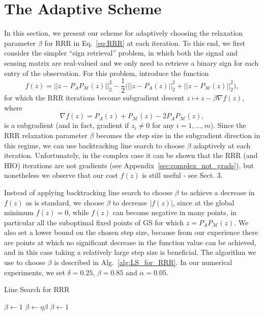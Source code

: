 \documentclass[12pt]{article}
\theoremstyle{definition}
\theoremstyle{remark}
\theoremstyle{definition}
\theoremstyle{problem}
\theoremstyle{definition}
\newcommand{\MM}{\mathcal{M}}
\begin{document}
\section{The Adaptive Scheme}
In this section, we present our scheme for adaptively choosing the relaxation parameter $\beta$ for RRR in Eq.~\ref{eq:RRR} at each iteration. To this end, we first consider the simpler ``sign retrieval'' problem, in which both the signal and sensing matrix are real-valued and we only need to retrieve a binary sign for each entry of the observation. For this problem, introduce the function 
\begin{equation}\label{eq:RRR_func}
    f(z) = ||z - P_AP_{\MM}(z)||_2^2 - \frac{1}{2}\Big(||z-P_A(z)||_2^2 + ||z-P_{\MM}(z)||_2^2\Big),
\end{equation}
for which the RRR iterations become subgradient descent $z\mapsto z-\beta\nabla f(z)$, where
\begin{equation}\label{eq:RRR_func_grad}
    \nabla f(z) = P_A(z) + P_{\MM}(z) - 2P_AP_{\MM}(z),
\end{equation}
is a subgradient (and in fact, gradient if $z_i\neq 0$ for any $i=1,\ldots, m$). Since the RRR relaxation parameter $\beta$ becomes the step size in the subgradient direction in this regime, we can use backtracking line search to choose $\beta$ adaptively at each iteration. Unfortunately, in the complex case it can be shown that the RRR (and HIO) iterations are not gradients (see Appendix~\ref{sec:complex_not_grads}), but nonetheless we observe that our cost $f(z)$ is still useful - see Sect. 3.

Instead of applying backtracking line search to choose $\beta$ to achieve a decrease in $f(z)$ as is standard, we choose $\beta$ to decrease $|f(z)|$, since at the global minimum $f(z)=0$, while $f(z)$ can become negative in many points, in particular all the suboptimal fixed points of GS for which $z = P_AP_{\MM}(z)$. We also set a lower bound on the chosen step size, because from our experience there are points at which no significant decrease in the function value can be achieved, and in this case taking a relatively large step size is beneficial. The algorithm we use to choose $\beta$ is described in Alg.~\ref{alg:LS_for_RRR}. In our numerical experiments, we set $\delta = 0.25$, $\beta = 0.85$ and $\alpha=0.05$.

\begin{algorithm}
\caption{Line Search for RRR}\label{alg:LS_for_RRR}
\begin{algorithmic}
\INPUT{$\alpha,\eta,\delta$}
\OUTPUT{$\beta$}
\State $\beta\gets 1$ 
    \State $\beta\gets \eta\beta$
\EndWhile
\If{$\beta \leq \delta$} 
    \State $\beta \gets 1$
\EndIf
\end{algorithmic}
\end{algorithm}
\end{document}

